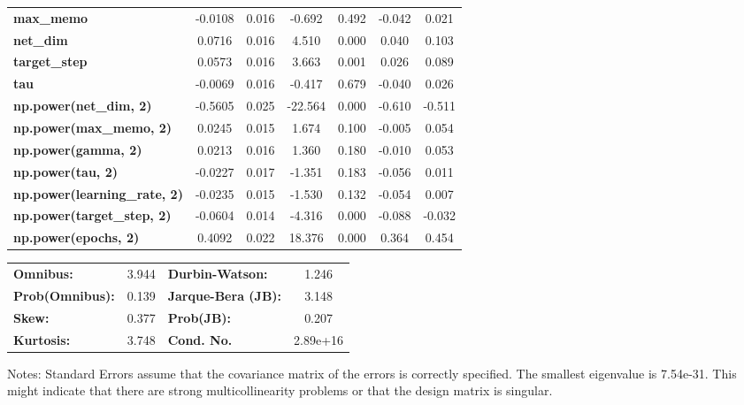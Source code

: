 \begin{center}
\begin{tabular}{lcccccc}
\textbf{max\_memo}                   &      -0.0108  &        0.016     &    -0.692  &         0.492        &       -0.042    &        0.021     \\
\textbf{net\_dim}                    &       0.0716  &        0.016     &     4.510  &         0.000        &        0.040    &        0.103     \\
\textbf{target\_step}                &       0.0573  &        0.016     &     3.663  &         0.001        &        0.026    &        0.089     \\
\textbf{tau}                         &      -0.0069  &        0.016     &    -0.417  &         0.679        &       -0.040    &        0.026     \\
\textbf{np.power(net\_dim, 2)}       &      -0.5605  &        0.025     &   -22.564  &         0.000        &       -0.610    &       -0.511     \\
\textbf{np.power(max\_memo, 2)}      &       0.0245  &        0.015     &     1.674  &         0.100        &       -0.005    &        0.054     \\
\textbf{np.power(gamma, 2)}          &       0.0213  &        0.016     &     1.360  &         0.180        &       -0.010    &        0.053     \\
\textbf{np.power(tau, 2)}            &      -0.0227  &        0.017     &    -1.351  &         0.183        &       -0.056    &        0.011     \\
\textbf{np.power(learning\_rate, 2)} &      -0.0235  &        0.015     &    -1.530  &         0.132        &       -0.054    &        0.007     \\
\textbf{np.power(target\_step, 2)}   &      -0.0604  &        0.014     &    -4.316  &         0.000        &       -0.088    &       -0.032     \\
\textbf{np.power(epochs, 2)}         &       0.4092  &        0.022     &    18.376  &         0.000        &        0.364    &        0.454     \\
\bottomrule
\end{tabular}
\begin{tabular}{lclc}
\textbf{Omnibus:}       &  3.944 & \textbf{  Durbin-Watson:     } &    1.246  \\
\textbf{Prob(Omnibus):} &  0.139 & \textbf{  Jarque-Bera (JB):  } &    3.148  \\
\textbf{Skew:}          &  0.377 & \textbf{  Prob(JB):          } &    0.207  \\
\textbf{Kurtosis:}      &  3.748 & \textbf{  Cond. No.          } & 2.89e+16  \\
\bottomrule
\end{tabular}
\end{center}

Notes: \newline
 [1] Standard Errors assume that the covariance matrix of the errors is correctly specified. \newline
 [2] The smallest eigenvalue is 7.54e-31. This might indicate that there are \newline
 strong multicollinearity problems or that the design matrix is singular.